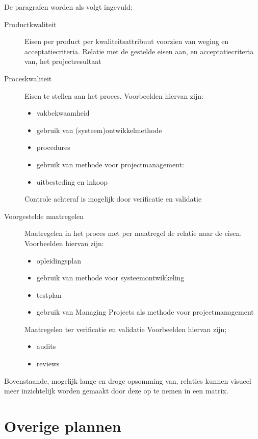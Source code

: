 \documentclass{article}
\begin{document}
De paragrafen worden als volgt ingevuld:

\begin{description}
  \item[Productkwaliteit] Eisen per product per kwaliteitsattribuut voorzien van weging en acceptatiecriteria.
  Relatie met de gestelde eisen aan, en acceptatiecriteria van, het projectresultaat
  \item[Proceskwaliteit] Eisen te stellen aan het proces. Voorbeelden hiervan zijn:
  \begin{itemize}
    \item vakbekwaamheid
    \item gebruik van (systeem)ontwikkelmethode
    \item procedures
    \item gebruik van methode voor projectmanagement:
    \item uitbesteding en inkoop
  \end{itemize}

  Controle achteraf is mogelijk door verificatie en validatie

  \item[Voorgestelde maatregelen] Maatregelen in het proces met per maatregel de relatie naar de eisen.
  Voorbeelden hiervan zijn:
  \begin{itemize}
    \item opleidingsplan
    \item gebruik van methode voor systeemontwikkeling
    \item testplan
    \item gebruik van Managing Projects als methode voor projectmanagement
  \end{itemize}

  Maatregelen ter verificatie en validatie
  Voorbeelden hiervan zijn;
  \begin{itemize}
    \item audits
    \item reviews
  \end{itemize}

\end{description}

Bovenstaande, mogelijk lange en droge opsomming van,
relaties kunnen visueel meer inzichtelijk worden gemaakt door deze op te nemen in een matrix.


\section{Overige plannen}
\end{document}
